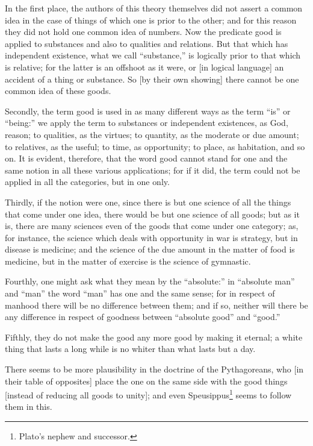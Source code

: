 In the first place, the authors of this theory themselves did not
assert a common idea in the case of things of which one is prior to
the other; and for this  reason they did not hold one common
idea of numbers. Now the predicate good is applied to substances and
also to qualities and relations. But that which has independent
existence, what we call ``substance,'' is logically prior to that
which is relative; for the latter is an offshoot as it were, or [in
logical language] an accident of a thing or substance. So [by their
own showing] there cannot be one common idea of these goods.

Secondly, the term good is used in as many different ways as the term
``is'' or ``being:'' we apply the term to substances or independent
existences, as God, reason; to qualities, as the virtues; to quantity,
as the moderate or due amount; to relatives, as the useful; to time,
as opportunity; to place, as habitation, and so on. It is evident,
therefore, that the word good cannot stand for one and the same notion
in all these various applications; for if it did, the term could not
be applied in all the categories, but in one only.

Thirdly, if the notion were one, since there is but one science of all
the things that come under one idea, there would be but one science of
all goods; but as it is, there are many sciences even of the goods
that come under one category; as, for instance, the science which
deals with opportunity in war is strategy, but in disease is medicine;
and the science of the due amount in the matter of food is medicine,
but in the matter of exercise is the science of gymnastic.

Fourthly, one might ask what they mean by the ``absolute:'' in
``absolute man'' and ``man'' the word ``man'' has one and the same
sense; for in respect of manhood there will be no difference between
them;  and if so, neither will there be any difference in
respect of goodness between ``absolute good'' and ``good.''

Fifthly, they do not make the good any more good by making it eternal;
a white thing that lasts a long while is no whiter than what lasts but
a day.

There seems to be more plausibility in the doctrine of the
Pythagoreans, who [in their table of opposites] place the one on the
same side with the good things [instead of reducing all goods to
unity]; and even Speusippus\footnote{Plato's nephew and successor.}
seems to follow them in this.


